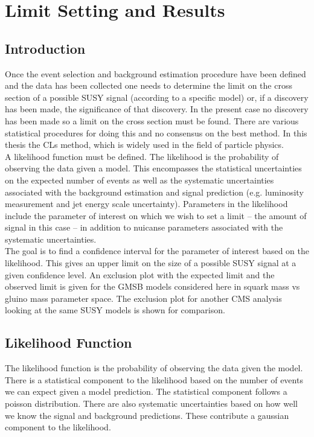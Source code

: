 \chapter{Limit Setting and Results}

\section{Introduction}

Once the event selection and background estimation procedure have been defined
and the data has been collected one needs to determine the limit on the cross
section of a possible SUSY signal (according to a specific model) or, if a 
discovery has been made, the significance of that discovery. In the present case 
no discovery has been made so a limit on the cross section must be found. There 
are various statistical procedures for doing this and no consensus on the best 
method. In this thesis the CLs method, which is widely used in the field of 
particle physics. \\

A likelihood function must be defined. The likelihood is the probability of 
observing the data given a model. This encompasses the statistical uncertainties
on the expected number of events as well as the systematic uncertainties 
associated with the background estimation and signal prediction (e.g. luminosity 
measurement and jet energy scale uncertainty). Parameters in the likelihood 
include the parameter of interest on which we wish to set a limit -- the amount
of signal in this case -- in addition to nuicanse parameters associated with 
the systematic uncertainties. \\

The goal is to find a confidence interval for the parameter of interest based
on the likelihood. This gives an upper limit on the size of a possible SUSY 
signal at a given confidence level. An exclusion plot with the expected limit
and the observed limit is given for the GMSB models considered here in squark 
mass vs gluino mass parameter space. The exclusion plot for another CMS analysis
looking at the same SUSY models is shown for comparison.

\section{Likelihood Function}

The likelihood function is the probability of observing the data given the
model. There is a statistical component to the likelihood based on the number of
events we can expect given a model prediction. The statistical component follows
a poisson distribution. There are also systematic uncertainties based on how 
well we know the signal and background predictions. These contribute a gaussian
component to the likelihood. \\

